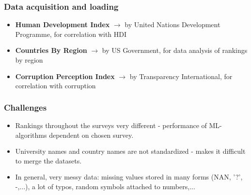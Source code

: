 \documentclass[mathserif,notheorems,11pt]{beamer}
\begin{document}
\begin{frame}
\frametitle{Data acquisition and loading}
\begin{itemize}
\item \textbf{Human Development Index} $\rightarrow$  by United Nations Development Programme, for correlation with HDI
\item \textbf{Countries By Region}  $\rightarrow$  by US Government, for data analysis of rankings by region
\item \textbf{Corruption Perception Index} $\rightarrow$  by Transparency International, for correlation with corruption
\end{itemize}

\end{frame}

\begin{frame} 
\frametitle{Challenges}

\begin{itemize}
\item Rankings throughout the surveys very different - performance of ML-algorithms dependent on chosen survey.

\item University names and country names are not standardized - makes it difficult to merge the datasets.

\item In general, very messy data: missing values stored in many forms (NAN, '?', -,...), a lot of typos, random symbols attached to numbers,...
\end{itemize}

\end{frame}
\end{document}
